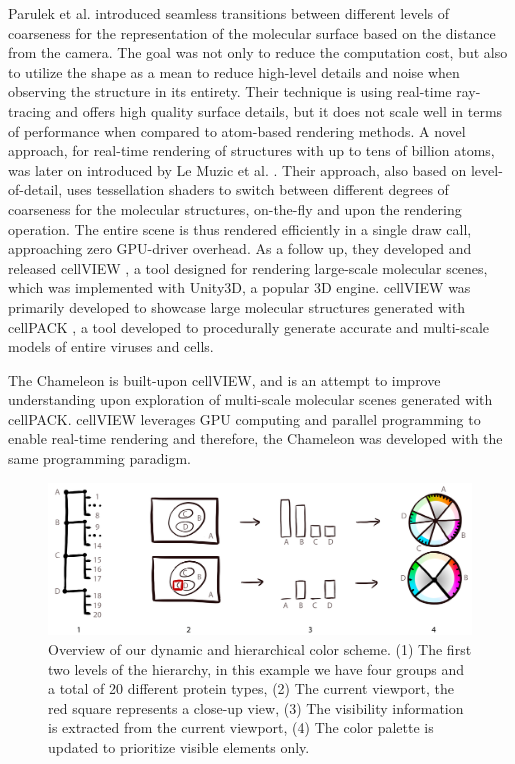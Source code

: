 \documentclass[review,journal]{vgtc}         %
\begin{document}
Parulek et al.\cite{parulek2014continuous} introduced seamless transitions between different levels of coarseness for the representation of the molecular surface based on the distance from the camera.
The goal was not only to reduce the computation cost, but also to utilize the shape as a mean to reduce high-level details and noise when observing the structure in its entirety.
Their technique is using real-time ray-tracing and offers high quality surface details, but it does not scale well in terms of performance when compared to atom-based rendering methods.
A novel approach, for real-time rendering of structures with up to tens of billion atoms, was later on introduced by Le Muzic et al. \cite{le2014illustrative}. 
Their approach, also based on level-of-detail, uses tessellation shaders to switch between different degrees of coarseness for the molecular structures, on-the-fly and upon the rendering operation.
The entire scene is thus rendered efficiently in a single draw call, approaching zero GPU-driver overhead. 
As a follow up, they developed and released cellVIEW \cite{muzic2015cellview}, a tool designed for rendering large-scale molecular scenes, which was implemented with Unity3D, a popular 3D engine.
cellVIEW was primarily developed to showcase large molecular structures generated with cellPACK \cite{johnson2015cellpack}, a tool developed to procedurally generate accurate and multi-scale models of entire viruses and cells.

The Chameleon is built-upon cellVIEW, and is an attempt to improve understanding upon exploration of multi-scale molecular scenes generated with cellPACK.
cellVIEW leverages GPU computing and parallel programming to enable real-time rendering and therefore, the Chameleon was developed with the same programming paradigm.


\begin{figure}[t]
	\centering
	\includegraphics[width=0.85\linewidth]{Figures/coloroverview}
	\caption{Overview of our dynamic and hierarchical color scheme. (1) The first two levels of the hierarchy, in this example we have four groups and a total of 20 different protein types, (2) The current viewport, the red square represents a close-up view, (3) The visibility information is extracted from the current viewport, (4) The color palette is updated to prioritize visible elements only.}
	\label{fig:coloroverview}
\end{figure}
\end{document}
